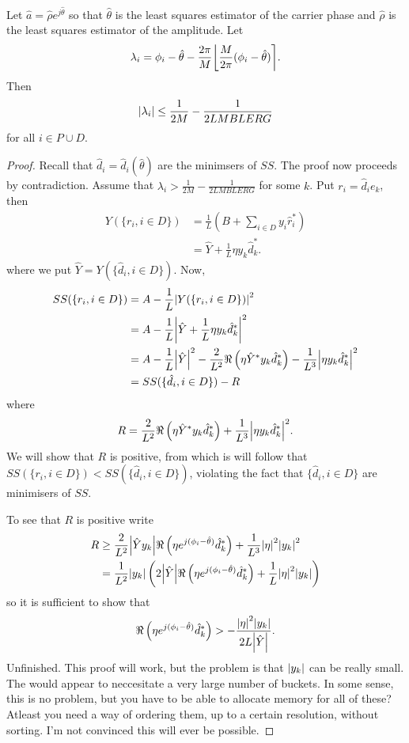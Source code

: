 \documentclass[a4paper,10pt]{article}
\begin{document}
\begin{lemma}
Let $\hat{a} = \hat{\rho}e^{j\hat{\theta}}$ so that $\hat{\theta}$ is the least squares estimator of the carrier phase and $\hat{\rho}$ is the least squares estimator of the amplitude.  Let 
\[
\lambda_i = \phi_i - \hat{\theta} - \frac{2\pi}{M}{\left\lfloor \frac{M}{2\pi}(\phi_i - \hat{\theta}) \right\rceil}.
\]
Then 
\[
{\left| \lambda_i \right|} \leq \frac{1}{2M} - \frac{1}{2LM BLERG}
\]
for all $i \in P \cup D$.
\end{lemma}
\begin{proof}
Recall that $\hat{d}_i = \hat{d}_i(\hat{\theta})$ are the minimsers of $SS$.  The proof now proceeds by contradiction.  Assume that $\lambda_i > \frac{1}{2M} - \frac{1}{2LM BLERG}$ for some $k$.  Put $r_i = \hat{d}_i e_k$, then
\begin{align*}
Y(\{ r_i, i \in D\}) &= \frac{1}{L}\left( B + \sum_{i \in D} y_i\hat{r}_i^* \right) \\
&= \hat{Y} + \frac{1}{L}\eta y_k\hat{d}_k^*.
\end{align*}
where we put $\hat{Y} = Y(\{ \hat{d}_i, i \in D\})$.  Now,
\begin{align*}
SS(\{r_i, i \in D\}) &= A - \frac{1}{L} {\left|  Y(\{ r_i, i \in D\})  \right|}^2 \\
&= A - \frac{1}{L} {\left|  \hat{Y} + \frac{1}{L} \eta y_k\hat{d}_k^*  \right|}^2 \\
&= A - \frac{1}{L}{\left| \hat{Y} \right|}^2 - \frac{2}{L^2}\Re\left(\eta \hat{Y}^* y_k \hat{d}_k^* \right) -  \frac{1}{L^3}{\left|  \eta y_k \hat{d}_k^*  \right|}^2\\
&= SS(\{\hat{d}_i, i \in D\}) - R
\end{align*}
where 
\[
R = \frac{2}{L^2}\Re\left(\eta \hat{Y}^* y_k \hat{d}_k^* \right) +  \frac{1}{L^3}{\left|  \eta y_k \hat{d}_k^*  \right|}^2.
\]
We will show that $R$ is positive, from which is will follow that $SS(\{r_i, i \in D\}) < SS(\{\hat{d}_i, i \in D\})$, violating the fact that $\{\hat{d}_i, i \in D\}$ are minimisers of $SS$.

To see that $R$ is positive write
\begin{align*}
R &\geq  \frac{2}{L^2}{\left| \hat{Y} y_k \right|}\Re\left(\eta e^{j(\phi_i - \hat{\theta})}\hat{d}_k^* \right) +  \frac{1}{L^3}{\left|  \eta \right|}^2 {\left|  y_k  \right|}^2 \\
&= \frac{1}{L^2}{\left| y_k \right|} \left( 2{\left| \hat{Y} \right|}\Re\left(\eta e^{j(\phi_i - \hat{\theta})} \hat{d}_k^* \right) + \frac{1}{L}{\left|  \eta \right|}^2 {\left|  y_k  \right|}  \right) 
\end{align*}
so it is sufficient to show that
\[
\Re\left(\eta e^{j(\phi_i - \hat{\theta})} \hat{d}_k^* \right) > - \frac{{\left|  \eta \right|}^2 {\left|  y_k  \right|}}{2 L {\left| \hat{Y} \right|}}.
\]
Unfinished.  This proof will work, but the problem is that ${\left| y_k \right|}$ can be really small.  The would appear to neccesitate a very large number of buckets.  In some sense, this is no problem, but you have to be able to allocate memory for all of these?  Atleast you need a way of ordering them, up to a certain resolution, without sorting.  I'm not convinced this will ever be possible.
\end{proof}
\end{document}
